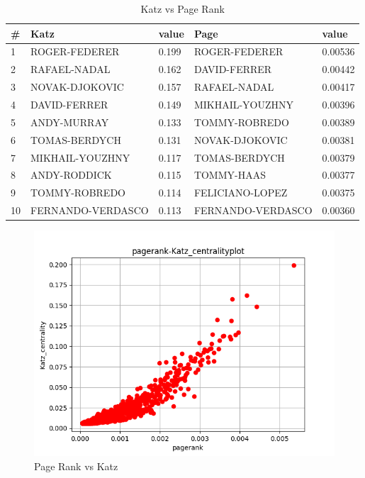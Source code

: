 \documentclass[runningheads]{llncs}
\begin{document}
\begin{table}
\centering
\caption{Katz vs Page Rank}\label{tab_katz_vs_page}
\begin{tabular}{|l|l|l|l|l|}
\hline
\# & Katz & value & Page & value \\ \hline
1 & ROGER-FEDERER & 0.199 & ROGER-FEDERER & 0.00536 \\ \hline
2 & RAFAEL-NADAL & 0.162 & DAVID-FERRER & 0.00442 \\ \hline
3 & NOVAK-DJOKOVIC & 0.157 & RAFAEL-NADAL & 0.00417 \\ \hline
4 & DAVID-FERRER & 0.149 & MIKHAIL-YOUZHNY & 0.00396 \\ \hline
5 & ANDY-MURRAY & 0.133 & TOMMY-ROBREDO & 0.00389 \\ \hline
6 & TOMAS-BERDYCH & 0.131 & NOVAK-DJOKOVIC & 0.00381 \\ \hline
7 & MIKHAIL-YOUZHNY & 0.117 & TOMAS-BERDYCH & 0.00379 \\ \hline
8 & ANDY-RODDICK & 0.115 & TOMMY-HAAS & 0.00377 \\ \hline
9 & TOMMY-ROBREDO & 0.114 & FELICIANO-LOPEZ & 0.00375 \\ \hline
10 & FERNANDO-VERDASCO & 0.113 & FERNANDO-VERDASCO & 0.00360 \\ \hline

\end{tabular}
\end{table}


\begin{figure}
\centering
\includegraphics[width=\textwidth]{3b_pagerank-Katz_centralityplot}
\caption{Page Rank vs Katz} \label{fig_3a_page_katz_plot}
\end{figure}
\end{document}
